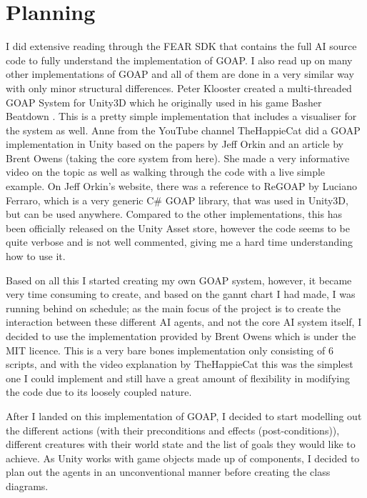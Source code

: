 \documentclass[12pt]{report}
\begin{document}
\section{Planning}
I did extensive reading through the FEAR SDK\cite{fearSDK} that contains the full AI source code to fully understand the implementation of GOAP.
I also read up on many other implementations of GOAP and all of them are done in a very similar way with only minor structural differences. 
Peter Klooster created a multi-threaded GOAP System for Unity3D which he originally used in his game Basher Beatdown \cite{basherGoap}. This is a pretty simple implementation that includes a visualiser for the system as well.
Anne from the YouTube channel TheHappieCat did a GOAP implementation in Unity \cite{happieGoapVideo} based on the papers by Jeff Orkin and an article by Brent Owens \cite{brentOwensGoap} (taking the core system from here). She made a very informative video on the topic as well as walking through the code with a live simple example.
On Jeff Orkin's website, there was a reference to ReGOAP by Luciano Ferraro, which is a very generic C\# GOAP library, that was used in Unity3D, but can be used anywhere. Compared to the other implementations, this has been officially released on the Unity Asset store, however the code seems to be quite verbose and is not well commented, giving me a hard time understanding how to use it.

Based on all this I started creating my own GOAP system, however, it became very time consuming to create, and based on the gannt chart I had made, I was running behind on schedule; as the main focus of the project is to create the interaction between these different AI agents, and not the core AI system itself, I decided to use the implementation provided by Brent Owens \cite{brentOwensGoapCode} which is under the MIT licence. This is a very bare bones implementation only consisting of 6 scripts, and with the video explanation by TheHappieCat this was the simplest one I could implement and still have a great amount of flexibility in modifying the code due to its loosely coupled nature.

After I landed on this implementation of GOAP, I decided to start modelling out the different actions (with their preconditions and effects (post-conditions)), different creatures with their world state and the list of goals they would like to achieve. As Unity works with game objects made up of components, I decided to plan out the agents in an unconventional manner before creating the class diagrams. 
\end{document}
